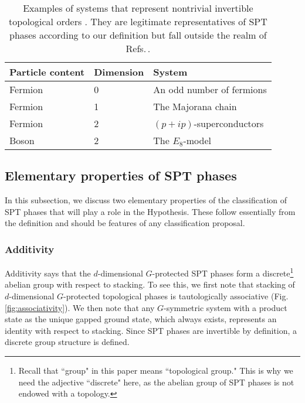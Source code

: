 \documentclass[sort&compress]{elsarticle}
\theoremstyle{theoremstyle}
\theoremstyle{framedtheoremstyle}
\theoremstyle{definitionstyle}
\theoremstyle{definitionstyle}
\theoremstyle{definitionstyle}
\theoremstyle{definitionstyle}
\theoremstyle{nameddefinitionstyle}
\theoremstyle{framednameddefinitionstyle}
\theoremstyle{proofstyle}
\theoremstyle{definitionstyle}
\newcommand{\paren}[1]{\left( #1 \right)}
\begin{document}
\begin{table}[t]
\caption{Examples of systems that represent nontrivial invertible topological orders \cite{Kitaev_Stony_Brook_2013_SRE}. They are legitimate representatives of SPT phases according to our definition but fall outside the realm of Refs.\,\cite{Wen_Definition,Cirac}.\label{table:SPT_examples}}
\begin{tabular}{lll}
\hline
\hline
Particle content & Dimension & System \\
\hline
Fermion & 0 & An odd number of fermions \\
Fermion & 1 & The Majorana chain \cite{Majorana_chain} \\
Fermion & 2 & $\paren{p+ip}$-superconductors \cite{Volovik_p+ip, Read_p+ip, Ivanov_p+ip} \\
Boson & 2 & The $E_8$-model \cite{Kitaev_honeycomb, 2dChiralBosonicSPT, Kitaev_KITP} \\
\hline
\hline
\end{tabular}
\end{table}





\subsection{Elementary properties of SPT phases\label{subsec:elementary_properties_SPT}}

In this subsection, we discuss two elementary properties of the classification of SPT phases that will play a role in the Hypothesis. These follow essentially from the definition and should be features of any classification proposal.

\subsubsection{Additivity\label{subsubsec:additivity}}

Additivity says that the $d$-dimensional $G$-protected SPT phases form a discrete\footnote{Recall that ``group" in this paper means ``topological group." This is why we need the adjective ``discrete" here, as the abelian group of SPT phases is not endowed with a topology.} abelian group with respect to stacking. To see this, we first note that stacking of $d$-dimensional $G$-protected topological phases is tautologically associative (Fig.\,\ref{fig:associativity}). We then note that any $G$-symmetric system with a product state as the unique gapped ground state, which always exists, represents an identity with respect to stacking. Since SPT phases are invertible by definition, a discrete group structure is defined.
\end{document}
